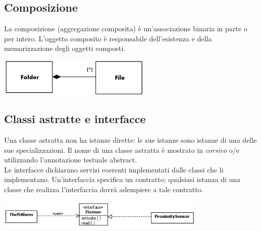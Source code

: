 \documentclass{article}
\begin{document}
\subsection*{Composizione}
\large

La composizione (aggregazione composita) è un'associazione binaria in parte o per intero. L'oggetto composito è responsabile dell'esistenza e della memorizzazione degli oggetti composti.
\begin{center}
    \includegraphics[width=0.55\textwidth]{foto 11.png}
\end{center}

\subsection*{Classi astratte e interfacce}
\large

Una classe astratta non ha istanze dirette: le sue istanze sono istanze di una delle sue specializzazioni. Il nome di una classe astratta è mostrato in \textit{corsivo} o/e utilizzando l'annotazione testuale {abstract}.\vspace{14pt}\\
Le interfacce dichiarano servizi coerenti implementati dalle classi che li implementano. Un'interfaccia specifica un contratto; qualsiasi istanza di una classe che realizza l'interfaccia dovrà adempiere a tale contratto.
\begin{center}
    \includegraphics[width=0.75\textwidth]{foto 12.png}
\end{center}
\end{document}
